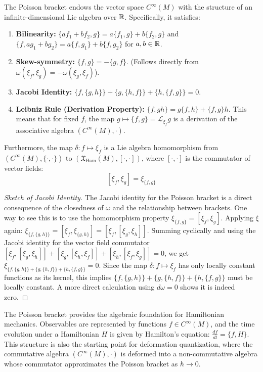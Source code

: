 \begin{proposition}
The Poisson bracket endows the vector space $C^\infty(M)$ with the structure of an infinite-dimensional Lie algebra over $\mathbb{R}$. Specifically, it satisfies:
\begin{enumerate}
    \item \textbf{Bilinearity:} $\{a f_1 + b f_2, g\} = a \{f_1, g\} + b \{f_2, g\}$ and $\{f, a g_1 + b g_2\} = a \{f, g_1\} + b \{f, g_2\}$ for $a, b \in \mathbb{R}$.
    \item \textbf{Skew-symmetry:} $\{f, g\} = -\{g, f\}$. (Follows directly from $\omega(\xi_f, \xi_g) = -\omega(\xi_g, \xi_f)$).
    \item \textbf{Jacobi Identity:} $\{f, \{g, h\}\} + \{g, \{h, f\}\} + \{h, \{f, g\}\} = 0$.
    \item \textbf{Leibniz Rule (Derivation Property):} $\{f, gh\} = g\{f, h\} + \{f, g\}h$. This means that for fixed $f$, the map $g \mapsto \{f, g\} = \mathcal{L}_{\xi_f} g$ is a derivation of the associative algebra $(C^\infty(M), \cdot)$.
\end{enumerate}
Furthermore, the map $\delta: f \mapsto \xi_f$ is a Lie algebra homomorphism from $(C^\infty(M), \{\cdot,\cdot\})$ to $(\mathfrak{X}_{\mathrm{Ham}}(M), [\cdot,\cdot])$, where $[\cdot,\cdot]$ is the commutator of vector fields:
\[
[\xi_f, \xi_g] = \xi_{\{f, g\}}
\]
\end{proposition}
\begin{proof}[Sketch of Jacobi Identity]
The Jacobi identity for the Poisson bracket is a direct consequence of the closedness of $\omega$ and the relationship between brackets. One way to see this is to use the homomorphism property $\xi_{\{f,g\}} = [\xi_f, \xi_g]$. Applying $\xi$ again: $\xi_{\{f, \{g, h\}\}} = [\xi_f, \xi_{\{g,h\}}] = [\xi_f, [\xi_g, \xi_h]]$. Summing cyclically and using the Jacobi identity for the vector field commutator $[\xi_f, [\xi_g, \xi_h]] + [\xi_g, [\xi_h, \xi_f]] + [\xi_h, [\xi_f, \xi_g]] = 0$, we get $\xi_{\{f, \{g, h\}\} + \{g, \{h, f\}\} + \{h, \{f, g\}\}} = 0$. Since the map $\delta: f \mapsto \xi_f$ has only locally constant functions as its kernel, this implies $\{f, \{g, h\}\} + \{g, \{h, f\}\} + \{h, \{f, g\}\}$ must be locally constant. A more direct calculation using $d\omega=0$ shows it is indeed zero.
\end{proof}

The Poisson bracket provides the algebraic foundation for Hamiltonian mechanics. Observables are represented by functions $f \in C^\infty(M)$, and the time evolution under a Hamiltonian $H$ is given by Hamilton's equation: $\frac{df}{dt} = \{f, H\}$. This structure is also the starting point for deformation quantization, where the commutative algebra $(C^\infty(M), \cdot)$ is deformed into a non-commutative algebra whose commutator approximates the Poisson bracket as $\hbar \to 0$.

